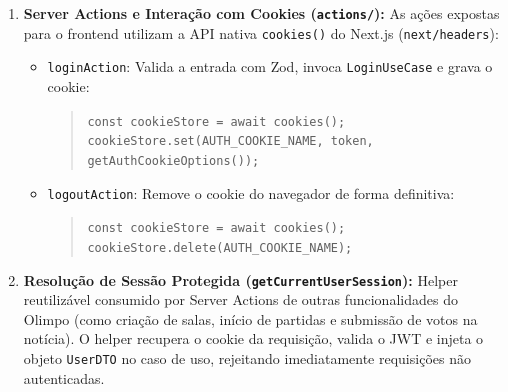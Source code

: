 \documentclass[12pt,a4paper]{article}
\begin{document}
\begin{enumerate}
  \begin{itemize}
    \item \texttt{RegisterUseCase}: Normaliza o e-mail, verifica se já existe na base através de \texttt{IUserRepository}, gera o hash da senha, persiste o novo registro com pontuação inicial de 0 XP e retorna a entidade.
    \item \texttt{LoginUseCase}: Localiza o usuário por e-mail, compara o hash da senha via \texttt{UserEntity.verifyPassword} e gera o token JWT assinado.
    \item \texttt{LogoutUseCase}: Coordena o fluxo de encerramento da sessão ativa.
    \item \texttt{GetSessionUseCase}: Extrai e valida a identidade do usuário logado a partir do token.
  \end{itemize}
  \item \textbf{Server Actions e Interação com Cookies (\texttt{actions/}):}
  As ações expostas para o frontend utilizam a API nativa \texttt{cookies()} do Next.js (\texttt{next/headers}):
  \begin{itemize}
    \item \texttt{loginAction}: Valida a entrada com Zod, invoca \texttt{LoginUseCase} e grava o cookie:
    \begin{quote}
      \texttt{const cookieStore = await cookies();}\\
      \texttt{cookieStore.set(AUTH\_COOKIE\_NAME, token, getAuthCookieOptions());}
    \end{quote}
    \item \texttt{logoutAction}: Remove o cookie do navegador de forma definitiva:
    \begin{quote}
      \texttt{const cookieStore = await cookies();}\\
      \texttt{cookieStore.delete(AUTH\_COOKIE\_NAME);}
    \end{quote}
  \end{itemize}
  \item \textbf{Resolução de Sessão Protegida (\texttt{getCurrentUserSession}):}
  Helper reutilizável consumido por Server Actions de outras funcionalidades do Olimpo (como criação de salas, início de partidas e submissão de votos na notícia). O helper recupera o cookie da requisição, valida o JWT e injeta o objeto \texttt{UserDTO} no caso de uso, rejeitando imediatamente requisições não autenticadas.
\end{enumerate}


\end{document}
